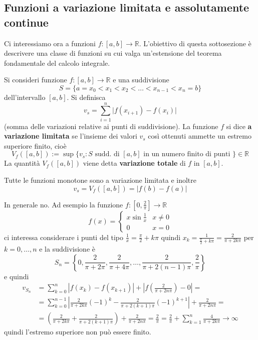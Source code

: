 \subsection{Funzioni a variazione limitata e assolutamente continue}
Ci interessiamo ora a funzioni \(f : [a, b] \to \mathbb{R}\). L'obiettivo di questa sottosezione è 
descrivere una classe di funzioni su cui valga un'estensione del teorema fondamentale del calcolo integrale.
\begin{definition}
    Si consideri funzione \(f: [a,b] \to \mathbb{R}\) e una suddivisione
    \[
      S = \{a = x_{0} < x_{1} < x_{2} < \dots < x_{n-1} < x_{n} = b\} 
    \]
    dell'intervallo \([a,b]\). Si definisca
    \[
      v_s = \sum_{i=1}^{n} |f{(x_{i+1}) -f{(x_{i})}|} 
    \]
    (somma delle variazioni relative ai punti di suddivisione).
    La funzione \(f\) si dice \textbf{a variazione limitata} 
    se l'insieme dei valori \(v_s\) così ottenuti ammette un estremo superiore
    finito, cioè 
    \[
        V_f ([a, b]):= \sup \{v_s : S \text{ sudd. di \([a,b]\) in un numero
                finito di
        punti  } \} \in \mathbb{R} 
    \]
    La quantità \(V_f{([a,b])}\) viene detta \textbf{variazione totale} di \(f\) in \([a,b]\).
    
\end{definition}
\begin{example}
    Tutte le funzioni monotone sono a variazione limitata e inoltre
    \[
        v_s = V_f{([a,b])} = |f{(b)} - f{(a)}|
    \]
\end{example}
\begin{example}
    In generale no. Ad esempio la funzione \(f : [0, \frac{2}{\pi}] \to
    \mathbb{R}\) 
    \[
      f{(x)} = \begin{cases}
          x \sin \frac{1}{x} & x \neq 0 \\
          0 & x = 0
      \end{cases}
    \]
    ci interessa considerare i punti del tipo \(\frac{1}{x} = \frac{\pi}{2} + k
    \pi\) quindi \(x_k = \frac{1}{\frac{\pi}{2} + k \pi} = \frac{2}{\pi + 2k\pi}\) per \(k = 0, \dots,
    n\) e la suddivisione è
    \[
        S_{n} = \left\{0, \frac{2}{\pi + 2\pi}, \frac{2}{\pi + 4\pi}, \dots,
        \frac{2}{\pi + 2(n-1)\pi}, \frac{2}{\pi}\right\}
    \]
    e quindi
    \begin{align*}
        v_{S_{n}}  &= \sum_{k=0}^{n} |f{(x_k)} - f{(x_{k+1})}| + \left|f{\left(\frac{2}{\pi
        + 2n \pi}\right)} - 0\right| =  \\
                   &= \sum_{k=0}^{n-1} \left| \frac{2}{\pi + 2k\pi}{(-1)}^{k} -
                   \frac{2}{\pi + 2(k+1)\pi}{(-1)}^{k+1} \right| + \frac{2}{\pi
                   + 2n \pi} = \\
        &= {\left( \frac{2}{\pi + 2k\pi} + \frac{2}{\pi + 2{(k+1)}\pi} \right)}
        + \frac{2}{\pi + 2n \pi} = \frac{2}{\pi} = \frac{2}{\pi} +
        \sum_{k=1}^{n} \frac{4}{\pi + 2k\pi} \to \infty 
    \end{align*}
    quindi l'estremo superiore non può essere finito.

\end{example}
